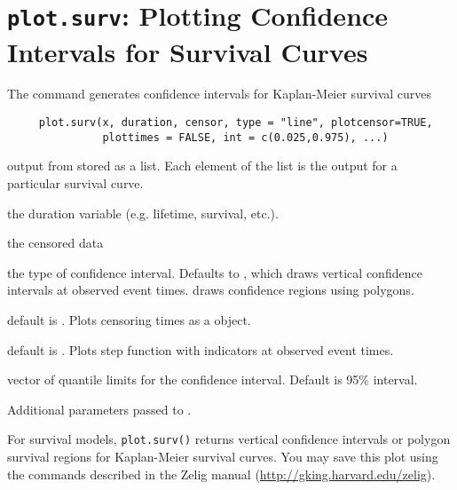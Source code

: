  \section{{\tt plot.surv}: Plotting Confidence Intervals for Survival Curves}\label{ss:plot.surv}
\begin{Description}\relax
The  command generates confidence intervals for Kaplan-Meier survival curves
\end{Description}
\begin{Usage}
\begin{verbatim}
     plot.surv(x, duration, censor, type = "line", plotcensor=TRUE,
               plottimes = FALSE, int = c(0.025,0.975), ...) 
\end{verbatim}
\end{Usage}
\begin{Arguments}
\begin{ldescription}
\item[\code{x}] output from  stored as a list.  Each element of the list is the  output for a particular survival curve.
\item[\code{duration}] the duration variable (e.g. lifetime, survival, etc.).
\item[\code{censor}] the censored data
\item[\code{type}] the type of confidence interval.  Defaults to , which draws vertical confidence intervals at observed event times.   draws confidence regions using polygons.
\item[\code{plotcensor}] default is . Plots censoring times as a  object.
\item[\code{plottimes}] default is . Plots step function with indicators at observed event times.
\item[\code{int}] vector of quantile limits for the confidence interval.  Default is 95\% interval.
\item[\code{...}] Additional parameters passed to .
\end{ldescription}
\end{Arguments}
\begin{Value}
For survival models, {\tt plot.surv()} returns vertical
confidence intervals or polygon survival regions for Kaplan-Meier survival curves.  You may save this plot using the commands described in the
Zelig manual (\url{http://gking.harvard.edu/zelig}).
\end{Value}
